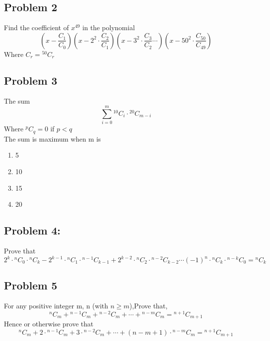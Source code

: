\documentclass[12pt]{article}
\begin{document}
\subsection*{Problem 2}
Find the coefficient of $x^{49}$ in the polynomial
\[
\left( {x}  - \frac{C_1}{C_0} \right)
\left( {x}  - 2^{2}\cdot \frac{C_2}{C_1}\right)
\left( {x}  - 3^{2}\cdot \frac{C_3}{C_2} \cdots \right)
\left( {x}  - 50^{2}\cdot \frac{C_{50}}{C_{49}}\right)
\]
Where $C_{r} = {}^{50}C_{r}$

\subsection*{Problem 3}
The sum\[
\sum_{i=0}^{m} {}^{10}C_{i} \cdot {}^{20}C_{m-i}
\]
Where $ {}^{p}C_{q} = 0$ if $p < q$ \\
The sum is maximum when m is 
\begin{enumerate}[label = (\Alph*)]
    \item 5
    \item 10
    \item 15
    \item 20
\end{enumerate}

\subsection*{Problem 4: }
Prove that \[
2^{k} \cdot {}^{n}C_{0} \cdot {}^{n}C_{k} -
2^{k-1} \cdot {}^{n}C_{1} \cdot {}^{n-1}C_{k-1} +
2^{k-2} \cdot {}^{n}C_{2} \cdot {}^{n-2}C_{k-2} \cdots 
(-1)^{n} \cdot {}^{n}C_{k} \cdot {}^{n-k}C_{0} = 
{}^{n}C_{k}
\]
\subsection*{Problem 5}
For any positive integer m, n (with $n \geq m$),Prove that, 
\[
{}^{n}C_{m}+
{}^{n-1}C_{m}+
{}^{n-2}C_{m}+ \cdots +
{}^{n-m}C_{m} = 
{}^{n+1}C_{m+1}
\]
Hence or otherwise prove that 
\[
{}^{n}C_{m}+
2 \cdot{}^{n-1}C_{m}+
3 \cdot{}^{n-2}C_{m}+ \cdots +
(n-m+1)\cdot {}^{n-m}C_{m} = 
{}^{n+1}C_{m+1}
\]
\newpage

\end{document}
